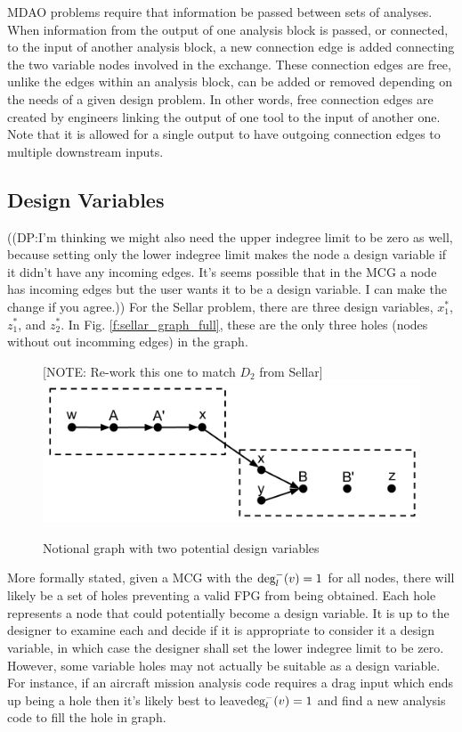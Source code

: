 MDAO problems require that information be passed between sets of analyses. When 
information from the output of one analysis block is passed, or connected, to the 
input of another analysis block, a new connection edge is added connecting the two 
variable nodes involved in the exchange. These connection edges are free, unlike the edges 
within an analysis block, can be added or removed depending on the needs
of a given design problem. In other words, free connection edges are created by 
engineers linking the output of one tool to the input of another one. Note that 
it is allowed for a single output to have outgoing connection edges to multiple 
downstream inputs. 

\subsection{Design Variables}
((DP:I'm thinking we might also need the upper indegree limit to be zero as well, because setting only the lower indegree limit makes the node a design variable if it didn't have any incoming edges. It's seems possible that in the MCG a node has incoming edges but the user wants it to be a design variable. I can make the change if you agree.))
For the Sellar problem, there are three design variables, $x_1^*$, $z_1^*$, and $z_2^*$. In Fig. 
\ref{f:sellar_graph_full}, these are the only three holes (nodes without out 
incomming edges) in the graph. 

\begin{figure}[htb!]
  \begin{center}
  [NOTE: Re-work this one to match $D_2$ from Sellar]
    \includegraphics[width=.6\textwidth]{images/design_vars_graph}
  \end{center}
  \caption{Notional graph with two potential design variables \label{f:designvars}}
\end{figure}

More formally stated, given a MCG with the $\textrm{deg}_l^-(v)=1$ for all nodes, 
there will likely be a set of holes preventing a valid FPG from being obtained. 
Each hole represents a node that could potentially become a design variable. 
It is up to the designer to examine each and decide if it is appropriate to 
consider it a design variable, in which case the designer shall set the lower 
indegree limit to be zero. However, some variable holes may not actually be 
suitable as a design variable. For instance, if an aircraft mission analysis 
code requires a drag input which ends up being a hole then it's likely best to 
leave$\textrm{deg}_l^-(v)=1$ and find a new analysis code to fill the hole in graph. 

